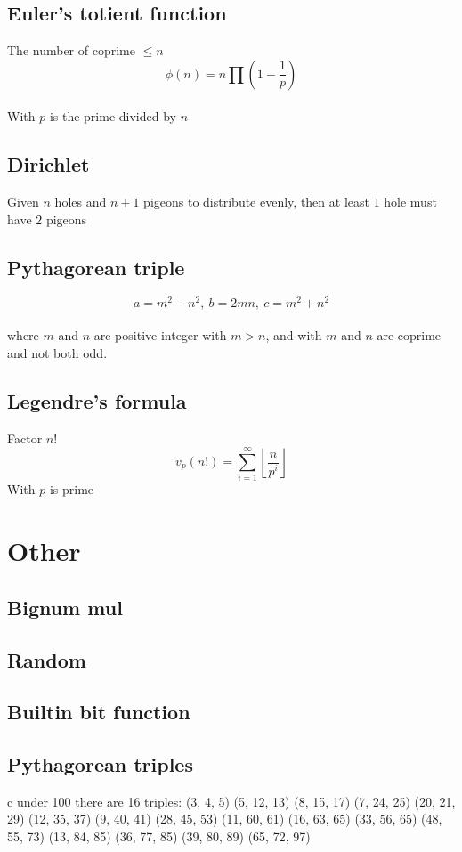 \documentclass[A4 paper, 12pt, oneside]{article}
\begin{document}
\begin{landscape}
\begin{multicols}{2}
	\subsection{Euler's totient function}
	The number of coprime $\leq n$ \\
	\[\phi(n) = n \prod (1 - \frac{1}{p}) \] \\
	With $p$ is the prime divided by $n$
	
	\subsection{Dirichlet}
	Given $n$ holes and $n + 1$ pigeons to distribute evenly, then at least $1$ hole must have $2$ pigeons
	
	\subsection{Pythagorean triple}
	\[a = m^2 - n^2, \ b = 2mn, \ c = m^2 + n^2 \] \\
	where $m$ and $n$ are positive integer with $m > n$, and with $m$ and $n$ are coprime and not both odd.
	
	\subsection{Legendre's formula}
	Factor $n!$
	\[v_p(n!) = \sum_{i = 1}^{\infty} \left \lfloor \frac{n}{p ^ i} \right \rfloor \]
	With $p$ is prime

\section{Other}
	\subsection{Bignum mul}
	
	
	\subsection{Random}
	
	
	\subsection{Builtin bit function}
	
	
	\subsection{Pythagorean triples}
	c under 100 there are 16 triples:
	(3, 4, 5)	(5, 12, 13)	(8, 15, 17)	(7, 24, 25)
(20, 21, 29)	(12, 35, 37)	(9, 40, 41)	(28, 45, 53)
(11, 60, 61)	(16, 63, 65)	(33, 56, 65)	(48, 55, 73)
(13, 84, 85)	(36, 77, 85)	(39, 80, 89)	(65, 72, 97) \\


\end{multicols}
\end{landscape}
\end{document}
